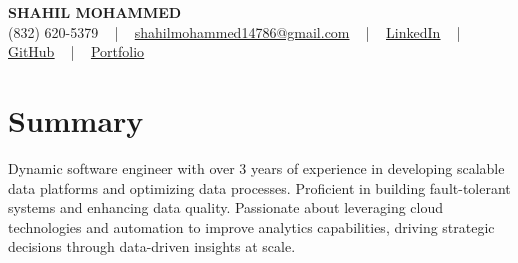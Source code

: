 \documentclass[letterpaper,10pt]{article}
\begin{document}
\begin{center}
    {\fontsize{14pt}{12pt}\selectfont \textbf{\MakeUppercase{Shahil Mohammed}}}\\ \vspace{2pt}
    \fontsize{10pt}{12pt}\selectfont (832) 620-5379 ~ | ~ \href{mailto:shahilmohammed14786@gmail.com}{shahilmohammed14786@gmail.com} ~ | ~  
    \href{https://www.linkedin.com/in/shahil-mohammed-9652931a1/}{\color{blue}\underline{LinkedIn}}  ~ | ~ 
    \href{https://github.com/freakbeast14}{\color{blue}\underline{GitHub}} ~ | ~ 
    \href{https://shahil-mohammed.netlify.app/}{\color{blue}\underline{Portfolio}}
    \vspace{-8pt}
\end{center}

\section{Summary}
\vspace{-2pt}\fontsize{8pt}{9pt}\selectfont
Dynamic software engineer with over 3 years of experience in developing scalable data platforms and optimizing data processes. Proficient in building fault-tolerant systems and enhancing data quality. Passionate about leveraging cloud technologies and automation to improve analytics capabilities, driving strategic decisions through data-driven insights at scale.
 \vspace{-5pt}
 
\vspace{-2pt}
\end{document}
